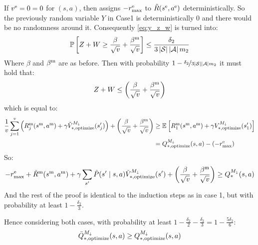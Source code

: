 If $v^\text{e} = 0 = 0$ for $(s, a)$, then \thealgo assigns $-r_{\text{max}}^\text{e}$ to $\tilde{R}(s^\text{e}, a^\text{e})$ deterministically. So the previously random variable $Y$ in Case1 is deterministically 0 and there would be no randomness around it. Consequently \cref{eq:y_z_w} is turned into:
%
\begin{equation*}
    \mathbb{P}\left[ {Z + W \geq \frac{\beta}{\sqrt{v}} + \frac{\beta^\text{m}}{\sqrt{v}}} \right] \leq \frac{\delta_2}{3\left \lvert \mathcal{S} \right \rvert\left \lvert \mathcal{A} \right \rvert m_2}
\end{equation*}
%
Where $\beta$ and $\beta^\text{m}$ are as before. Then with probability $1 - \nicefrac{\delta_2}{3\left \lvert \mathcal{S} \right \rvert\left \lvert \mathcal{A} \right \rvert m_2}$  it must hold that:
    \begin{equation*}
        Z +W \leq \left(\frac{\beta}{\sqrt v} + \frac{\beta^\text{m}}{\sqrt v} \right)
    \end{equation*}
    which is equal to:
    \begin{align*}
        \frac 1v\sum_{j = 1}^{v}\left(R^\text{m}_j(s^\text{m}, a^\text{m}) + \gamma \tilde{V}^{{M}_{\downarrow}}_{*, \text{optimize}}(s_{j}')\right) + \left(\frac{\beta}{\sqrt v} + \frac{\beta^\text{m}}{\sqrt v}\right) & \geq \mathbb{E}_{}\left[ {R^\text{m}_1(s^\text{m}, a^\text{m}) + \gamma V^{{M}_{\downarrow}}_{*, \text{optimize}}(s_1')} \right] \\
        & = Q^{{M}_{\downarrow}}_{*, \text{optimize}}(s, a) - (-r_{\text{max}}^\text{e})
    \end{align*}
    So:
    \begin{equation}
        -r_{\text{max}}^\text{e} + \tilde{R}^\text{m}(s^\text{m}, a^\text{m}) + \gamma \sum_{s'}\tilde{P}(s' \mid s, a)\tilde{V}^{{M}_{\downarrow}}_{*, \text{optimize}}(s') + \left(\frac{\beta}{\sqrt v} + \frac{\beta^\text{m}}{\sqrt v} \right) \geq Q^{M_{\downarrow}}_{*}(s, a)
    \end{equation}
And the rest of the proof is identical to the induction steps as in case 1, but with probability at least $1 - \frac{\delta_2}{3}$.

Hence considering both cases, with probability at least $1 - \frac{\delta_2}{2} - \frac{\delta_2}{3} = 1 - \frac{5\delta_2}{6}$:
\begin{equation*}
    \bar{Q}_{*, \text{optimize}}^{M_{\downarrow}}(s, a) \geq Q^{M_{\downarrow}}_{*, \text{optimize}}(s, a)
\end{equation*}
%
%
%
